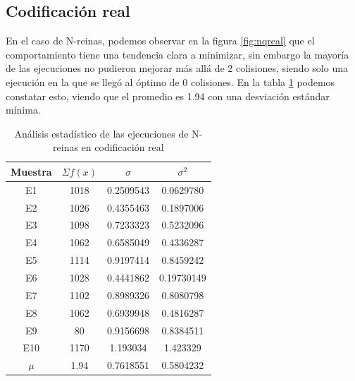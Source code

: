 \documentclass[letterpaper,12pt]{article}
\theoremstyle{definition}
\begin{document}
\subsection{Codificación real}

En el caso de N-reinas, podemos observar en la figura \ref{fig:nqreal} que el comportamiento tiene una tendencia clara a minimizar, sin embargo la mayoría de las ejecuciones no pudieron mejorar más allá de 2 colisiones, siendo solo una ejecución en la que se llegó al óptimo de 0 colisiones. En la tabla \ref{tab:nqreal} podemos constatar esto, viendo que el promedio es 1.94 con una desviación estándar mínima.

\begin{table}
  \begin{center}
    \begin{tabular}{cccc}
      \toprule 
        Muestra & \(\Sigma f(x)\) & \(\sigma\)  & \(\sigma^2\)  \\
        \midrule
        \rowcolor{black!20} E1 & 1018 & 0.2509543 & 0.0629780 \\
        E2 & 1026 & 0.4355463 & 0.1897006 \\
        \rowcolor{black!20} E3 & 1098 & 0.7233323 & 0.5232096\\
        E4 & 1062 & 0.6585049 & 0.4336287\\
        \rowcolor{black!20} E5 & 1114 & 0.9197414 & 0.8459242 \\
        E6 & 1028 & 0.4441862 & 0.19730149 \\
        \rowcolor{black!20} E7 & 1102 & 0.8989326 & 0.8080798 \\
        E8 & 1062 & 0.6939948 & 0.4816287\\
        \rowcolor{black!20} E9 & 80 & 0.9156698 & 0.8384511 \\
        E10 & 1170 & 1.193034 & 1.423329 \\
        \rowcolor{black!20} \(\mu\) & 1.94 & 0.7618551 & 0.5804232 \\ 
        \bottomrule
      \end{tabular}
  \end{center}
  \caption{Análisis estadístico de las ejecuciones de N-reinas en codificación real}
  \label{tab:nqreal}  
\end{table}
\end{document}
